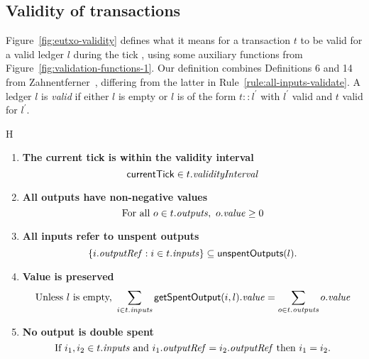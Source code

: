 \subsection{Validity of \EUTXO{} transactions}
\label{sec:eutxo-validity}

Figure~\ref{fig:eutxo-validity} defines what it means for a
transaction $t$ to be valid for a valid ledger $l$ during the tick
\currentTick, using some auxiliary functions from
Figure~\ref{fig:validation-functions-1}.  Our definition combines
Definitions 6 and 14 from Zahnentferner~\cite{Zahnentferner18-UTxO},
differing from the latter in Rule~\ref{rule:all-inputs-validate}. A
ledger $l$ is \textit{valid} if either $l$ is empty or $l$ is of the
form $t::l^{\prime}$ with $l^{\prime}$ valid and $t$ valid for
$l^{\prime}$.
\vspace{-2mm}
\begin{ruledfigure}{H}
\begin{enumerate}

\item
  \label{rule:tick-in-range}
  \textbf{The current tick is within the validity interval}
  \begin{displaymath}
    \mathsf{currentTick} \in t.\mathit{validityInterval}
  \end{displaymath}

\item
  \label{rule:all-outputs-are-non-negative}
  \textbf{All outputs have non-negative values}
  \begin{displaymath}
    \textrm{For all } o \in t.\mathit{outputs},\ o.\mathit{value} \geq 0
  \end{displaymath}

\item
  \label{rule:all-inputs-refer-to-unspent-outputs}
  \textbf{All inputs refer to unspent outputs}
  \begin{displaymath}
    \{i.\mathit{outputRef} : i \in t.\mathit{inputs} \} \subseteq \mathsf{unspentOutputs}(l).
  \end{displaymath}

\item
  \label{rule:value-is-preserved}
  \textbf{Value is preserved}
  \begin{displaymath}
    \textrm{Unless $l$ is empty, } \sum_{i \in t.\mathit{inputs}} \mathsf{getSpentOutput}(i, l).\mathit{value} = \sum_{o \in t.\mathit{outputs}} o.\mathit{value}
  \end{displaymath}

\item
  \label{rule:no-double-spending}
  \textbf{No output is double spent}
  \begin{displaymath}
    \textrm{If } i_1, i_2 \in t.\mathit{inputs} \textrm{ and }  i_1.\mathit{outputRef} = i_2.\mathit{outputRef}
    \textrm{ then } i_1 = i_2.
  \end{displaymath}


\end{enumerate}
\end{ruledfigure}
